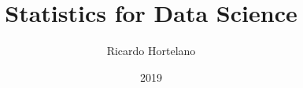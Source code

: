 \documentclass[fontsize=12pt,paper=letter,headings=big,chapterprefix=off,DIV=calc,headsepline=true,titlepage=on,BCOR=5mm,parskip=half*,appendixprefix=true]{scrbook} 			%
\title{Statistics for Data Science}
\author{Ricardo Hortelano}
\date{2019}
\begin{document}
\frontmatter %

\maketitle

\tableofcontents

\listoftodos %




\mainmatter %




\end{document}
